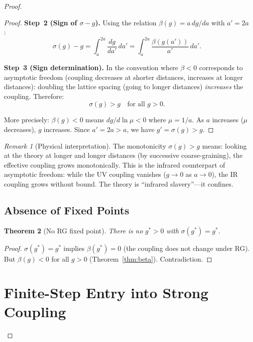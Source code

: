 \documentclass[12pt,a4paper]{article}
\theoremstyle{plain}
\newtheorem{theorem}{Theorem}[section]
\theoremstyle{definition}
\theoremstyle{remark}
\newtheorem{remark}[theorem]{Remark}
\begin{document}
\begin{proof}
\begin{proof}
\textbf{Step~2 (Sign of $\sigma-g$).} Using the relation $\beta(g)=a\,dg/da$ with $a'=2a$:
\begin{equation}\label{eq:sigma_g}
\sigma(g) - g = \int_a^{2a} \frac{dg}{da'}\,da' = \int_a^{2a}\frac{\beta(g(a'))}{a'}\,da'.
\end{equation}

\textbf{Step~3 (Sign determination).} In the convention where $\beta<0$ corresponds to asymptotic freedom (coupling decreases at shorter distances, increases at longer distances): doubling the lattice spacing (going to longer distances) \emph{increases} the coupling. Therefore:
\begin{equation}\label{eq:monotone}
\sigma(g) > g \quad\text{for all }g>0.
\end{equation}

More precisely: $\beta(g)<0$ means $dg/d\ln\mu<0$ where $\mu=1/a$. As $a$ increases ($\mu$ decreases), $g$ increases. Since $a'=2a>a$, we have $g'=\sigma(g)>g$.
\end{proof}

\begin{remark}[Physical interpretation]\label{rem:monotone}
The monotonicity $\sigma(g)>g$ means: looking at the theory at longer and longer distances (by successive coarse-graining), the effective coupling grows monotonically. This is the infrared counterpart of asymptotic freedom: while the UV coupling vanishes ($g\to 0$ as $a\to 0$), the IR coupling grows without bound. The theory is ``infrared slavery''---it confines.
\end{remark}

\subsection{Absence of Fixed Points}\label{sec:nofixed}

\begin{theorem}[No RG fixed point]\label{thm:nofixed}
There is no $g^*>0$ with $\sigma(g^*)=g^*$.
\end{theorem}

\begin{proof}
$\sigma(g^*)=g^*$ implies $\beta(g^*)=0$ (the coupling does not change under RG). But $\beta(g)<0$ for all $g>0$ (Theorem~\ref{thm:beta}). Contradiction.
\end{proof}

\section{Finite-Step Entry into Strong Coupling}\label{sec:finitestep}


\end{proof}
\end{document}
